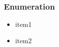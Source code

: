 
\begin{frame}
\frametitle{Enumeration}
	\begin{itemize}
		\item item1
		\item item2
	\end{itemize}
\end{frame}
